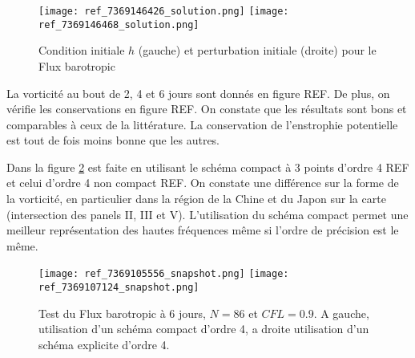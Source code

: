 \begin{figure}[ht]
\begin{center}
\texttt{[image: ref\_7369146426\_solution.png]}
\texttt{[image: ref\_7369146468\_solution.png]}
\end{center}
\caption{Condition initiale $h$ (gauche) et perturbation initiale (droite) pour le Flux barotropic \cite{Galewsky2004}}
\label{fig: initiale et perturbation Galewsky}
\end{figure}

La vorticité au bout de 2, 4 et 6 jours sont donnés en figure REF. De plus, on vérifie les conservations en figure REF. On constate que les résultats sont bons et comparables à ceux de la littérature. La conservation de l'enstrophie potentielle est tout de fois moins bonne que les autres.

Dans la figure \ref{fig: galewsky compact/explicite} est faite en utilisant le schéma compact à 3 points d'ordre 4 REF et celui d'ordre 4 non compact REF. On constate une différence sur la forme de la vorticité, en particulier dans la région de la Chine et du Japon sur la carte (intersection des panels II, III et V). L'utilisation du schéma compact permet une meilleur représentation des hautes fréquences même si l'ordre de précision est le même.

\begin{figure}[ht]
\begin{center}
\texttt{[image: ref\_7369105556\_snapshot.png]}
\texttt{[image: ref\_7369107124\_snapshot.png]}
\end{center}
\caption{Test du Flux barotropic \cite{Galewsky2004} à 6 jours, $N=86$ et $CFL=0.9$. A gauche, utilisation d'un schéma compact d'ordre 4, a droite utilisation d'un schéma explicite d'ordre 4.}
\label{fig: galewsky compact/explicite}
\end{figure}
